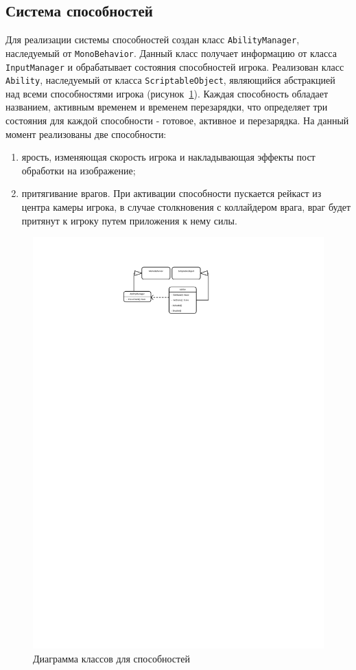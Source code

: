 \subsection{Система способностей}
Для реализации системы способностей создан класс \texttt{AbilityManager}, наследуемый от \texttt{MonoBehavior}. Данный класс получает информацию от класса \texttt{InputManager} и обрабатывает состояния способностей игрока. Реализован класс \texttt{Ability}, наследуемый от класса \texttt{ScriptableObject}, являющийся абстракцией над всеми способностями игрока (рисунок~\ref{fig:Ability}). Каждая способность обладает названием, активным временем и временем перезарядки, что определяет три состояния для каждой способности - готовое, активное и перезарядка. На данный момент реализованы две способности:
\begin{enumerate}
\item  ярость, изменяющая скорость игрока и накладывающая эффекты пост обработки на изображение;
\item  притягивание врагов. При активации способности пускается рейкаст из центра камеры игрока, в случае столкновения с коллайдером врага, враг будет притянут к игроку путем приложения к нему силы.
\end{enumerate}

\begin{figure}[H]
    \centering
    \includegraphics[width=\textwidth]{figures/Ability.pdf}
    \caption{Диаграмма классов для способностей}
    \label{fig:Ability}
\end{figure}
